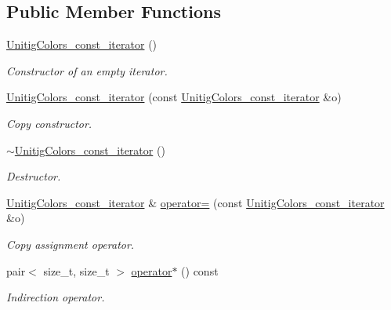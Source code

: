 \subsection*{Public Member Functions}
\begin{DoxyCompactItemize}
\item 
\hyperlink{classUnitigColors_1_1UnitigColors__const__iterator_a01ef8ae04a7b535c43a9fea17d9564ab}{Unitig\+Colors\+\_\+const\+\_\+iterator} ()
\begin{DoxyCompactList}\small\item\em Constructor of an empty iterator. \end{DoxyCompactList}\item 
\hyperlink{classUnitigColors_1_1UnitigColors__const__iterator_a879ba744a0fa0bf46f829523c7e28196}{Unitig\+Colors\+\_\+const\+\_\+iterator} (const \hyperlink{classUnitigColors_1_1UnitigColors__const__iterator}{Unitig\+Colors\+\_\+const\+\_\+iterator} \&o)
\begin{DoxyCompactList}\small\item\em Copy constructor. \end{DoxyCompactList}\item 
\mbox{\label{classUnitigColors_1_1UnitigColors__const__iterator_ad56df0c744a8f597b987c3952db07b26}} 
\hyperlink{classUnitigColors_1_1UnitigColors__const__iterator_ad56df0c744a8f597b987c3952db07b26}{$\sim$\+Unitig\+Colors\+\_\+const\+\_\+iterator} ()
\begin{DoxyCompactList}\small\item\em Destructor. \end{DoxyCompactList}\item 
\hyperlink{classUnitigColors_1_1UnitigColors__const__iterator}{Unitig\+Colors\+\_\+const\+\_\+iterator} \& \hyperlink{classUnitigColors_1_1UnitigColors__const__iterator_af31737d4940cba427c48b3ac09553eee}{operator=} (const \hyperlink{classUnitigColors_1_1UnitigColors__const__iterator}{Unitig\+Colors\+\_\+const\+\_\+iterator} \&o)
\begin{DoxyCompactList}\small\item\em Copy assignment operator. \end{DoxyCompactList}\item 
pair$<$ size\+\_\+t, size\+\_\+t $>$ \hyperlink{classUnitigColors_1_1UnitigColors__const__iterator_acbeaf566652c50221b59da6c81d940ea}{operator$\ast$} () const
\begin{DoxyCompactList}\small\item\em Indirection operator. \end{DoxyCompactList}\item 

\end{DoxyCompactItemize}
